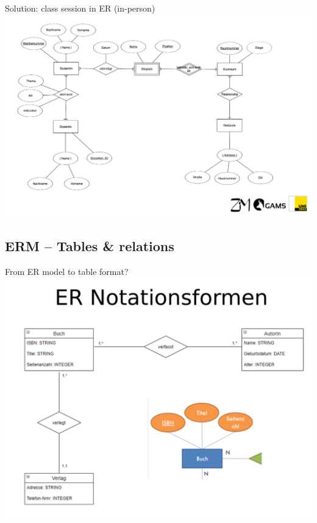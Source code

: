 \begin{frame}{Solution: class session in ER (in-person) }
    \includegraphics[width=\textwidth]{img/wdh-er-kursmodellierung.png}
\end{frame}


\subsection{ERM -- Tables \& relations}

\begin{frame}{From ER model to table format?}
    \includegraphics[width=\textwidth]{img/er-notation-buch.png}
\end{frame}

